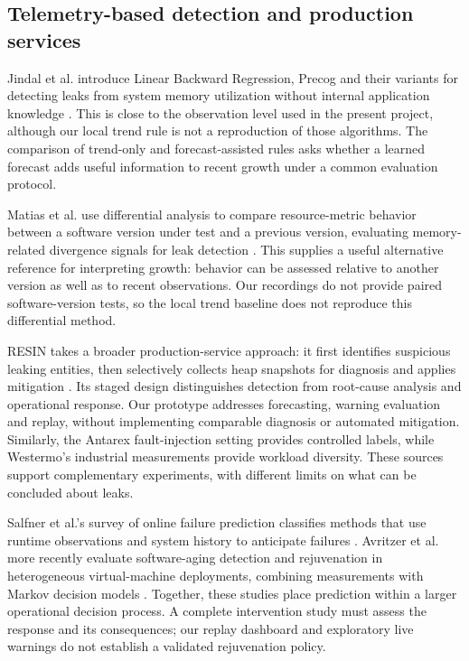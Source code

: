 \documentclass[10pt,a4paper,twocolumn]{article}
\begin{document}
\subsection{Telemetry-based detection and production services}

Jindal et al. introduce Linear Backward Regression, Precog and their variants for detecting leaks from system memory utilization without internal application knowledge \cite{ref1}. This is close to the observation level used in the present project, although our local trend rule is not a reproduction of those algorithms. The comparison of trend-only and forecast-assisted rules asks whether a learned forecast adds useful information to recent growth under a common evaluation protocol.

Matias et al. use differential analysis to compare resource-metric behavior between a software version under test and a previous version, evaluating memory-related divergence signals for leak detection \cite{ref20}. This supplies a useful alternative reference for interpreting growth: behavior can be assessed relative to another version as well as to recent observations. Our recordings do not provide paired software-version tests, so the local trend baseline does not reproduce this differential method.

RESIN takes a broader production-service approach: it first identifies suspicious leaking entities, then selectively collects heap snapshots for diagnosis and applies mitigation \cite{ref21}. Its staged design distinguishes detection from root-cause analysis and operational response. Our prototype addresses forecasting, warning evaluation and replay, without implementing comparable diagnosis or automated mitigation. Similarly, the Antarex fault-injection setting \cite{ref3,ref4,ref5} provides controlled labels, while Westermo's industrial measurements \cite{ref6} provide workload diversity. These sources support complementary experiments, with different limits on what can be concluded about leaks.

Salfner et al.'s survey of online failure prediction classifies methods that use runtime observations and system history to anticipate failures \cite{ref22}. Avritzer et al. more recently evaluate software-aging detection and rejuvenation in heterogeneous virtual-machine deployments, combining measurements with Markov decision models \cite{ref23}. Together, these studies place prediction within a larger operational decision process. A complete intervention study must assess the response and its consequences; our replay dashboard and exploratory live warnings do not establish a validated rejuvenation policy.
\end{document}
